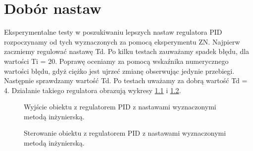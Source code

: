 \chapter{Dobór nastaw}
Eksperymentalne testy w poszukiwaniu lepszych nastaw regulatora PID rozpoczynamy od tych wyznaczonych za pomocą eksperymentu ZN.
Najpierw zaczniemy regulować nastawę Td. Po kilku testach zauważamy spadek błędu, dla wartości Ti = 20. Poprawę oceniamy za pomocą wskaźnika numerycznego wartości błędu,
gdyż ciężko jest ujrzeć zmianę obserwując jedynie przebiegi. Następnie sprawdzamy wartość Td. Po testach uważamy za dobrą wartość Td = 4. Działanie takiego regulatora
obrazują wykresy \ref{fig:inz_pid_out} i \ref{fig:inz_pid_ster}.

\begin{figure}[tb]
\centering
{}
\caption{Wyjście obiektu z regulatorem PID z nastawami wyznaczonymi metodą inżynierską.}
\label{fig:inz_pid_out}
\end{figure}

\begin{figure}[tb]
\centering
{}
\caption{Sterowanie obiektu z regulatorem PID z nastawami wyznaczonymi metodą inżynierską.}
\label{fig:inz_pid_ster}
\end{figure}
